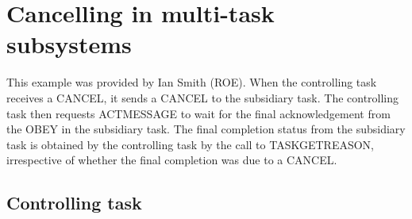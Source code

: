 \documentclass[twoside,11pt]{article}
\newcommand{\xlabel}[1]{}
\renewcommand{\_}{\texttt{\symbol{95}}}
\begin{document}
\begin{quote}
\begin{verbatim}
\end{verbatim} \end{quote} \normalsize

\newpage

\section{Cancelling in multi-task subsystems
\label{cmotask}\xlabel{cancelling_in_multitask_subsystems}}

This example was provided by Ian Smith (ROE). When the controlling task 
receives a CANCEL, it sends a CANCEL to the subsidiary task. The 
controlling task then requests ACT\_\_MESSAGE to wait for the 
final acknowledgement from the OBEY in the subsidiary task. The final 
completion status from the subsidiary task is obtained by the 
controlling task by the call to TASK\_GET\_REASON, irrespective of 
whether the final completion was due to a CANCEL.

\subsection{Controlling task}
\end{document}
